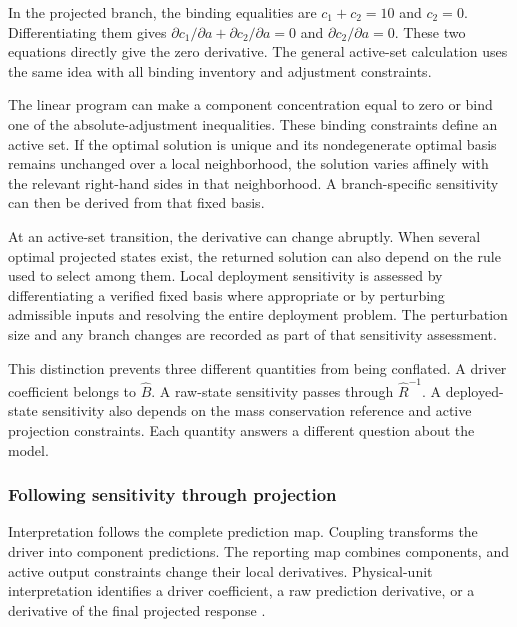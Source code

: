 In the projected branch, the binding equalities are \(c_1+c_2=10\) and \(c_2=0\). Differentiating them gives \(\partial c_1/\partial a+\partial c_2/\partial a=0\) and \(\partial c_2/\partial a=0\). These two equations directly give the zero derivative. The general active-set calculation uses the same idea with all binding inventory and adjustment constraints.

The linear program can make a component concentration equal to zero or bind one of the absolute-adjustment inequalities. These binding constraints define an active set. If the optimal solution is unique and its nondegenerate optimal basis remains unchanged over a local neighborhood, the solution varies affinely with the relevant right-hand sides in that neighborhood. A branch-specific sensitivity can then be derived from that fixed basis.

At an active-set transition, the derivative can change abruptly. When several optimal projected states exist, the returned solution can also depend on the rule used to select among them. Local deployment sensitivity is assessed by differentiating a verified fixed basis where appropriate or by perturbing admissible inputs and resolving the entire deployment problem. The perturbation size and any branch changes are recorded as part of that sensitivity assessment.

This distinction prevents three different quantities from being conflated. A driver coefficient belongs to \(\widehat B\). A raw-state sensitivity passes through \(\widehat R^{-1}\). A deployed-state sensitivity also depends on the mass conservation reference and active projection constraints. Each quantity answers a different question about the model.

\subsubsection{Following sensitivity through projection}

Interpretation follows the complete prediction map. Coupling transforms the driver into component predictions. The reporting map combines components, and active output constraints change their local derivatives. Physical-unit interpretation identifies a driver coefficient, a raw prediction derivative, or a derivative of the final projected response \citep{Brunton2016,Shen2023}.

